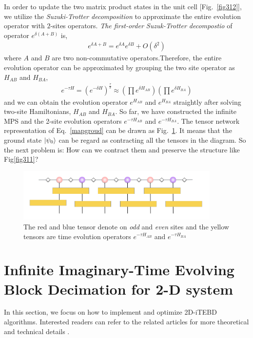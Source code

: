 In order to update the two matrix product states in the unit cell [Fig.~\ref{fig312}], we utilize the \textit{Suzuki-Trotter decomposition} to approximate the entire evolution operator with $2$-sites operators. \textit{The first-order Suzuk-Trotter decompostio} of operator $e^{\delta (A+B)}$ is,
\begin{align}
	\label{STd}
	e^{\delta A + B} = e^{\delta A}e^{\delta B} + O(\delta^2)
\end{align}
where $A$ and $B$ are two non-commutative operators.Therefore, the entire evolution operator can be approximated by grouping the two site operator as $H_{AB}$ and $H_{BA}$,
\begin{align}
	\label{evoopt}
	e^{-\tau H} = \left(e^{-\delta H}\right)^{\frac{\tau}{\delta}} \approx \left(\prod e^{\delta H_{AB}} \right)\left( \prod e^{\delta H_{BA}}\right)
\end{align}
and we can obtain the evolution operator $e^{H_{AB}}$ and $e^{H_{BA}}$ straightly after solving two-site Hamiltonians, $H_{AB}$ and $H_{BA}$.
So far, we have constructed the infinite MPS and the 2-site evolution operators $e^{-\tau H_{AB}}$ and $e^{-\tau H_{BA}}$. The tensor network representation of Eq.~\ref{mapgroud} can be drawn as Fig.~\ref{fig313}. It means that the ground state $\Ket{\psi_0}$ can be regard as contracting all the tensors in the diagram. So the next problem is: How can we contract them and preserve the structure like Fig{\ref{fig311}}?

\begin{figure}[ht]
	\centering
	\includegraphics[width=0.90\textwidth]{figures/fig312.png}
	\caption[The tensor diagram of imaginary time evolving block decimation.]{The red and blue tensor denote on \textit{odd} and \textit{even} sites and the yellow tensors are time evolution operators $e^{-\tau H_{AB}}$ and $e^{-\tau H_{BA}}$}
	\label{fig313}
\end{figure}
\section{Infinite Imaginary-Time Evolving Block Decimation for 2-D system}

In this section, we focus on how to implement and optimize 2D-iTEBD algorithms. Interested readers can refer to the related articles for more theoretical and technical details  \cite{PhysRevLett.99.220405, PhysRevLett.101.090603, PhysRevB.78.155117}.
\label{itebd}

